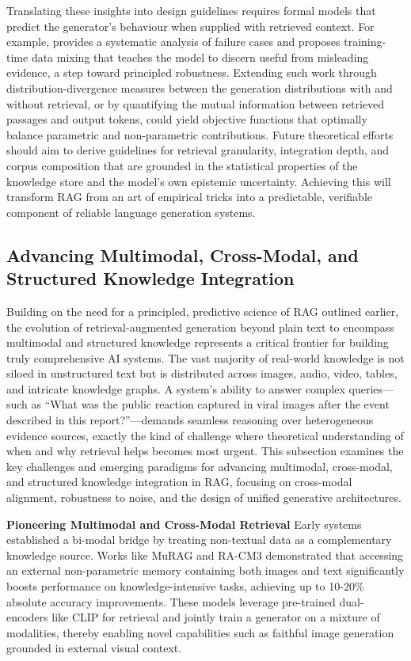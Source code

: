 \documentclass[11pt,a4paper]{article}
\begin{document}
Translating these insights into design guidelines requires formal models that predict the generator's behaviour when supplied with retrieved context. For example, \cite{arxiv:2310.01558v1} provides a systematic analysis of failure cases and proposes training-time data mixing that teaches the model to discern useful from misleading evidence, a step toward principled robustness. Extending such work through distribution-divergence measures between the generation distributions with and without retrieval, or by quantifying the mutual information between retrieved passages and output tokens, could yield objective functions that optimally balance parametric and non-parametric contributions. Future theoretical efforts should aim to derive guidelines for retrieval granularity, integration depth, and corpus composition that are grounded in the statistical properties of the knowledge store and the model's own epistemic uncertainty. Achieving this will transform RAG from an art of empirical tricks into a predictable, verifiable component of reliable language generation systems.


\subsection{Advancing Multimodal, Cross-Modal, and Structured Knowledge Integration}


Building on the need for a principled, predictive science of RAG outlined earlier, the evolution of retrieval-augmented generation beyond plain text to encompass multimodal and structured knowledge represents a critical frontier for building truly comprehensive AI systems. The vast majority of real-world knowledge is not siloed in unstructured text but is distributed across images, audio, video, tables, and intricate knowledge graphs. A system's ability to answer complex queries---such as ``What was the public reaction captured in viral images after the event described in this report?''---demands seamless reasoning over heterogeneous evidence sources, exactly the kind of challenge where theoretical understanding of when and why retrieval helps becomes most urgent. This subsection examines the key challenges and emerging paradigms for advancing multimodal, cross-modal, and structured knowledge integration in RAG, focusing on cross-modal alignment, robustness to noise, and the design of unified generative architectures.

\textbf{Pioneering Multimodal and Cross-Modal Retrieval}  
Early systems established a bi-modal bridge by treating non-textual data as a complementary knowledge source. Works like MuRAG \cite{arxiv:2210.02928v2} and RA-CM3 demonstrated that accessing an external non-parametric memory containing both images and text significantly boosts performance on knowledge-intensive tasks, achieving up to 10-20\% absolute accuracy improvements. These models leverage pre-trained dual-encoders like CLIP for retrieval and jointly train a generator on a mixture of modalities, thereby enabling novel capabilities such as faithful image generation grounded in external visual context.
\end{document}
